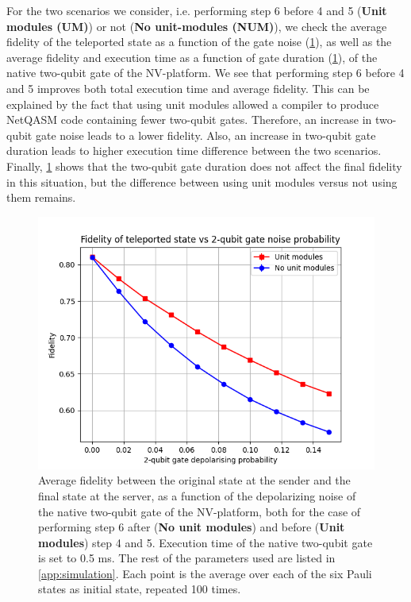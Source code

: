 For the two scenarios we consider, i.e. performing step 6 before 4 and 5 (\textbf{Unit modules (UM)}) or not (\textbf{No unit-modules (NUM)}), we check the average fidelity of the teleported state as a function of the gate noise (\cref{fig:sweep_gate_noise}), as well as the average fidelity and execution time as a function of gate duration (\cref{fig:sweep_gate_noise}), of the native two-qubit gate of the NV-platform. We see that performing step 6 before 4 and 5 improves both total execution time and average fidelity.
This can be explained by the fact that using unit modules allowed a compiler to produce \ac{NetQASM} code containing fewer two-qubit gates.
Therefore, an increase in two-qubit gate noise leads to a lower fidelity.
Also, an increase in two-qubit gate duration leads to higher execution time difference between the two scenarios.
Finally, \cref{fig:sweep_gate_noise} shows that the two-qubit gate duration does not affect the final fidelity in this situation, but the difference between using unit modules versus not using them remains.


\begin{figure}[t]
    \centering
    \includegraphics[scale=0.8]{figures/netqasm/plots/paper_teleport_sweep_gate_noise.png}
    \caption{
        Average fidelity between the original state at the sender and
        the final state at the server, as a function of the depolarizing noise
        of the native two-qubit gate of the NV-platform, both for the case of
        performing step 6 after (\textbf{No unit modules}) and before
        (\textbf{Unit modules}) step 4 and 5. Execution time of the native
        two-qubit gate is set to 0.5 ms. The rest of the parameters used are
        listed in \cref{app:simulation}. Each point is the average over each of
        the six Pauli states as initial state, repeated 100 times.}
    \label{fig:sweep_gate_noise}
\end{figure}

